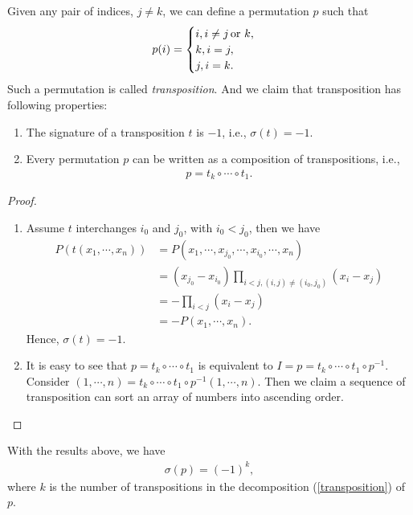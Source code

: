 \documentclass[11pt]{book}
\theoremstyle{definition}
\numberwithin{equation}{chapter}
\begin{document}
Given any pair of indices, $j\neq k$, we can define a permutation $p$ such that
\begin{align*}
    p(i) = \begin{cases}
    i, i\neq j\, {\rm or}\,\, k, \\
    k, i = j, \\
    j, i = k.
    \end{cases}
\end{align*}
Such a permutation is called \emph{transposition}. And we claim that transposition has following properties:
\begin{enumerate}[label=(\alph*)]
    \item The signature of a transposition $t$ is $-1$, i.e., $\sigma(t) = -1$.
    \item Every permutation $p$ can be written as a composition of transpositions, i.e., 
    \begin{align}\label{transposition}
        p = t_k\circ \cdots \circ t_1.
    \end{align}
\end{enumerate}
\begin{proof}
~\begin{enumerate}[label=(\alph*)]
    \item Assume $t$ interchanges $i_0$ and $j_0$, with $i_0<j_0$, then we have
    \begin{align*}
        P\left(t(x_1,\cdots,x_n)\right) & = P(x_1,\cdots,x_{j_0},\cdots,x_{i_0},\cdots,x_n) \\
        & = (x_{j_0} - x_{i_0})\prod_{i<j,(i,j)\neq(i_0,j_0)} (x_i - x_j) \\
        & = - \prod_{i<j}(x_i - x_j) \\
        & = - P(x_1,\cdots,x_n).
    \end{align*}
    Hence, $\sigma(t) = -1$.
    \item It is easy to see that $p = t_k\circ \cdots \circ t_1$ is equivalent to $I = p = t_k\circ \cdots \circ t_1 \circ p^{-1}$. Consider $(1,\cdots, n) = t_k\circ \cdots \circ t_1 \circ p^{-1}(1,\cdots,n)$. Then we claim a sequence of transposition can sort an array of numbers into ascending order.
\end{enumerate}
\end{proof}

With the results above, we have
\begin{align*}
    \sigma(p) = (-1)^{k},
\end{align*}
where $k$ is the number of transpositions in the decomposition (\ref{transposition}) of $p$.
\end{document}
